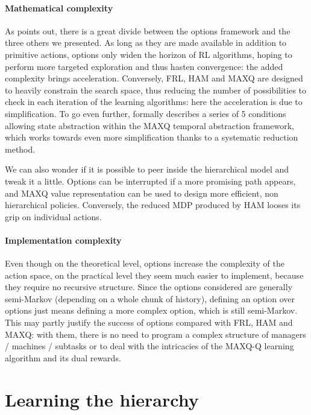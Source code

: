 \documentclass{article}
\begin{document}
\paragraph{Mathematical complexity} As \cite{jong_utility_2008} points out, there is a great divide between the options framework and the three others we presented. As long as they are made available in addition to primitive actions, options only widen the horizon of RL algorithms, hoping to perform more targeted exploration and thus hasten convergence: the added complexity brings acceleration. Conversely, FRL, HAM and MAXQ are designed to heavily constrain the search space, thus reducing the number of possibilities to check in each iteration of the learning algorithms: here the acceleration is due to simplification. To go even further, \cite{dietterich_hierarchical_2000} formally describes a series of 5 conditions allowing state abstraction within the MAXQ temporal abstraction framework, which works towards even more simplification thanks to a systematic reduction method.

We can also wonder if it is possible to peer inside the hierarchical model and tweak it a little. Options can be interrupted if a more promising path appears, and MAXQ value representation can be used to design more efficient, non hierarchical policies. Conversely, the reduced MDP produced by HAM looses its grip on individual actions.

\paragraph{Implementation complexity} Even though on the theoretical level, options increase the complexity of the action space, on the practical level they seem much easier to implement, because they require no recursive structure. Since the options considered are generally semi-Markov (depending on a whole chunk of history), defining an option over options just means defining a more complex option, which is still semi-Markov. This may partly justify the success of options compared with FRL, HAM and MAXQ: with them, there is no need to program a complex structure of managers / machines / subtasks or to deal with the intricacies of the MAXQ-Q learning algorithm and its dual rewards.

\section{Learning the hierarchy} \label{learning}
\end{document}
